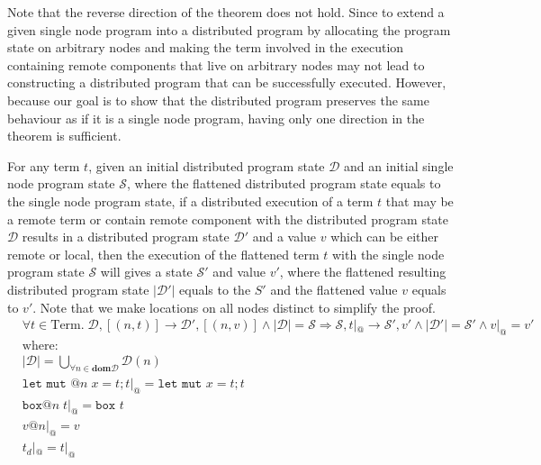 Note that the reverse direction of the theorem does not hold. Since to extend a given single node program into a distributed program by allocating the program state on arbitrary nodes and making the term involved in the execution containing remote components that live on arbitrary nodes may not lead to constructing a distributed program that can be successfully executed. However, because our goal is to show that the distributed program preserves the same behaviour as if it is a single node program, having only one direction in the theorem is sufficient.

\begin{theorem}
For any term $t$, given an initial distributed program state $\mathcal{D}$ and an initial single node program state $\mathcal{S}$, where the flattened distributed program state equals to the single node program state, if a distributed execution of a term $t$ that may be a remote term or contain remote component with the distributed program state $\mathcal{D}$ results in a distributed program state $\mathcal{D}'$ and a value $v$ which can be either remote or local, then the execution of the flattened term $t$ with the single node program state $\mathcal{S}$ will gives a state $\mathcal{S}'$ and value $v'$, where the flattened resulting distributed program state $|\mathcal{D}'|$ equals to the $S'$ and the flattened value $v$ equals to $v'$. Note that we make locations on all nodes distinct to simplify the proof.
\begin{align*}
    &\forall t \in \mathrm{Term}.\; \mathcal{D}, [(n, t)] \longrightarrow \mathcal{D'}, [(n, v)] \land |\mathcal{D}| = \mathcal{S}  \Rightarrow \mathcal{S},  t|_@ \longrightarrow \mathcal{S'}, v' \land |\mathcal{D}'| = \mathcal{S}' \land v|_@ = v'\\
    &\mathrm{where:}\\
    &|\mathcal{D}| = \bigcup_{\forall n \in \textbf{dom} \mathcal{D}} \mathcal{D}(n)\\
    &\texttt{let mut }@n\; x=t; t|_@ =  \texttt{let mut } x=t; t\\
    &\texttt{box}@n\; t |_@ = \texttt{box }t\\
    &v@n|_@ = v\\
    &t_d|_@ = t |_@
\end{align*}
\label{chap3:thm:loc-transp}
\end{theorem}
